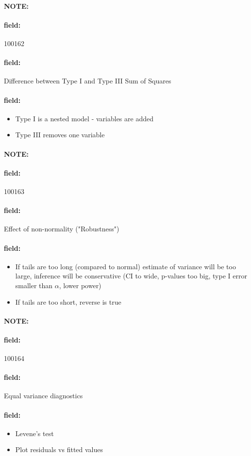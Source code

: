 \documentclass[12pt]{article}
\newenvironment{note}{\paragraph{NOTE:}}{}
\newenvironment{field}{\paragraph{field:}}{}
\begin{document}
\begin{note}
 \begin{field}
  \tiny 100162
 \end{field}
 \begin{field}
  Difference between Type I and Type III Sum of Squares
 \end{field}
 \begin{field}
  \begin{itemize}
   \item Type I is a nested model - variables are added
   \item Type III removes one variable
  \end{itemize}
 \end{field}
\end{note}

\begin{note}
 \begin{field}
  \tiny 100163
 \end{field}
 \begin{field}
  Effect of non-normality ("Robustness")
 \end{field}
 \begin{field}
  \begin{itemize}
   \item If tails are too long (compared to normal) estimate of variance will be too large, inference will be conservative (CI to wide, p-values too big, type I error smaller than $\alpha$, lower power)
   \item If tails are too short, reverse is true
  \end{itemize}
 \end{field}
\end{note}

\begin{note}
 \begin{field}
  \tiny 100164
 \end{field}
 \begin{field}
  Equal variance diagnostics
 \end{field}
 \begin{field}
  \begin{itemize}
   \item Levene's test
   \item Plot residuals vs fitted values
  \end{itemize}
 \end{field}
\end{note}
\end{document}
